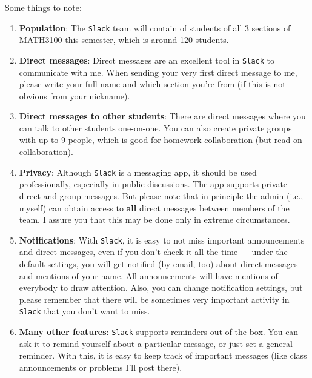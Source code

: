 \documentclass[oneside,11pt]{amsart}
\begin{document}
Some things to note: 
\begin{enumerate}[$\bullet$] 
	\item \textbf{Population}:
		The \texttt{Slack} team will contain of students
		of all 3 sections of MATH3100 this semester, which is 
		around 120 students.
	\item \textbf{Direct messages}:
		Direct messages are an excellent tool in \texttt{Slack} to communicate
		with me. When sending your very first direct message to me, please 
		write your full name and which section you're from (if this is not obvious from your nickname).
	\item \textbf{Direct messages to other students}:
		There are direct messages where you can talk to other students
		one-on-one. 
		You can also create private groups with up to 9 people, which
		is good for homework collaboration (but read  on
		collaboration).
	\item \textbf{Privacy}:
		Although \texttt{Slack} is a messaging app, it should be used
		professionally, especially in public discussions. The app supports private
		direct and group messages. But please note that in principle the admin
		(i.e., myself) can obtain access to \textbf{all} direct messages between
		members of the team. 
		I assure you that this may be done only in extreme circumstances.
	\item \textbf{Notifications}:
		With \texttt{Slack}, it is easy to not miss important announcements and direct messages, 
		even if 
		you don't check it all the time --- 
		under the default settings, you will get notified (by email, too)
		about direct messages and mentions of your name. 
		All announcements will have mentions of everybody
		to draw attention. 
		Also, you can change notification settings, but please remember that
		there will be sometimes very important activity in \texttt{Slack} that you don't want to miss.
	\item \textbf{Many other features}: 
		\texttt{Slack} supports reminders out of the box. 
		You can ask it to remind yourself about a particular message, or 
		just set a general reminder. 
		With this, it is 
		easy to keep track of important messages
		(like class announcements or problems I'll post there).
\end{enumerate}
\end{document}
